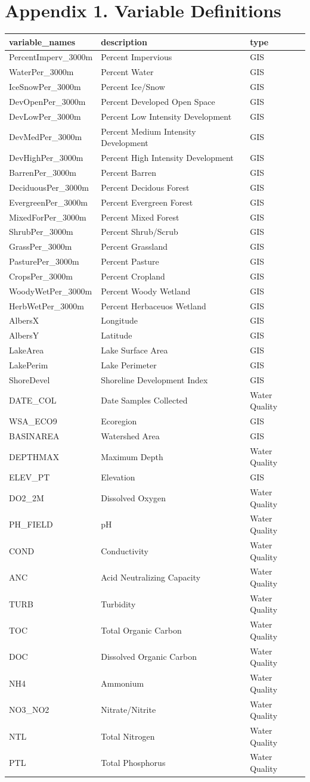 \documentclass[11pt,]{article}
\begin{document}
\section{Appendix 1. Variable
Definitions}\label{appendix-1.-variable-definitions}

\begin{longtable}[c]{@{}lll@{}}
\toprule
variable\_names & description & type\tabularnewline
\midrule
\endhead
PercentImperv\_3000m & Percent Impervious & GIS\tabularnewline
WaterPer\_3000m & Percent Water & GIS\tabularnewline
IceSnowPer\_3000m & Percent Ice/Snow & GIS\tabularnewline
DevOpenPer\_3000m & Percent Developed Open Space & GIS\tabularnewline
DevLowPer\_3000m & Percent Low Intensity Development &
GIS\tabularnewline
DevMedPer\_3000m & Percent Medium Intensity Development &
GIS\tabularnewline
DevHighPer\_3000m & Percent High Intensity Development &
GIS\tabularnewline
BarrenPer\_3000m & Percent Barren & GIS\tabularnewline
DeciduousPer\_3000m & Percent Decidous Forest & GIS\tabularnewline
EvergreenPer\_3000m & Percent Evergreen Forest & GIS\tabularnewline
MixedForPer\_3000m & Percent Mixed Forest & GIS\tabularnewline
ShrubPer\_3000m & Percent Shrub/Scrub & GIS\tabularnewline
GrassPer\_3000m & Percent Grassland & GIS\tabularnewline
PasturePer\_3000m & Percent Pasture & GIS\tabularnewline
CropsPer\_3000m & Percent Cropland & GIS\tabularnewline
WoodyWetPer\_3000m & Percent Woody Wetland & GIS\tabularnewline
HerbWetPer\_3000m & Percent Herbaceuos Wetland & GIS\tabularnewline
AlbersX & Longitude & GIS\tabularnewline
AlbersY & Latitude & GIS\tabularnewline
LakeArea & Lake Surface Area & GIS\tabularnewline
LakePerim & Lake Perimeter & GIS\tabularnewline
ShoreDevel & Shoreline Development Index & GIS\tabularnewline
DATE\_COL & Date Samples Collected & Water Quality\tabularnewline
WSA\_ECO9 & Ecoregion & GIS\tabularnewline
BASINAREA & Watershed Area & GIS\tabularnewline
DEPTHMAX & Maximum Depth & Water Quality\tabularnewline
ELEV\_PT & Elevation & GIS\tabularnewline
DO2\_2M & Dissolved Oxygen & Water Quality\tabularnewline
PH\_FIELD & pH & Water Quality\tabularnewline
COND & Conductivity & Water Quality\tabularnewline
ANC & Acid Neutralizing Capacity & Water Quality\tabularnewline
TURB & Turbidity & Water Quality\tabularnewline
TOC & Total Organic Carbon & Water Quality\tabularnewline
DOC & Dissolved Organic Carbon & Water Quality\tabularnewline
NH4 & Ammonium & Water Quality\tabularnewline
NO3\_NO2 & Nitrate/Nitrite & Water Quality\tabularnewline
NTL & Total Nitrogen & Water Quality\tabularnewline
PTL & Total Phosphorus & Water Quality\tabularnewline

\end{longtable}
\end{document}
